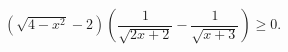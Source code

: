 \begin{ex}[type=inequality]
	\begin{condition}
		$\left(\sqrt{4 - x^2} - 2\right)\left(\dfrac{1}{\sqrt{2x + 2}} - \dfrac{1}{\sqrt{x + 3}}\right)\geqslant0.$
	\end{condition}
\end{ex}